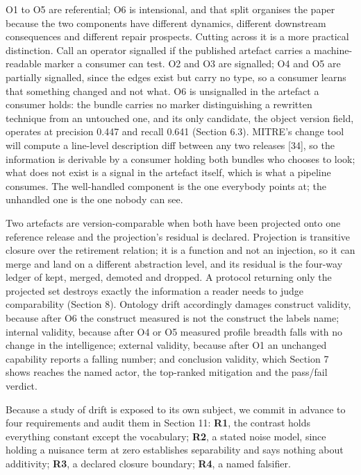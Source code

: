 \documentclass[11pt,a4paper]{article}
\begin{document}
O1 to O5 are referential; O6 is intensional, and that split organises the paper because the two components have different dynamics, different downstream consequences and different repair prospects. Cutting across it is a more practical distinction. Call an operator signalled if the published artefact carries a machine-readable marker a consumer can test. O2 and O3 are signalled; O4 and O5 are partially signalled, since the edges exist but carry no type, so a consumer learns that something changed and not what. O6 is unsignalled in the artefact a consumer holds: the bundle carries no marker distinguishing a rewritten technique from an untouched one, and its only candidate, the object version field, operates at precision 0.447 and recall 0.641 (Section 6.3). MITRE's change tool will compute a line-level description diff between any two releases [34], so the information is derivable by a consumer holding both bundles who chooses to look; what does not exist is a signal in the artefact itself, which is what a pipeline consumes. The well-handled component is the one everybody points at; the unhandled one is the one nobody can see.

Two artefacts are version-comparable when both have been projected onto one reference release and the projection's residual is declared. Projection is transitive closure over the retirement relation; it is a function and not an injection, so it can merge and land on a different abstraction level, and its residual is the four-way ledger of kept, merged, demoted and dropped. A protocol returning only the projected set destroys exactly the information a reader needs to judge comparability (Section 8). Ontology drift accordingly damages construct validity, because after O6 the construct measured is not the construct the labels name; internal validity, because after O4 or O5 measured profile breadth falls with no change in the intelligence; external validity, because after O1 an unchanged capability reports a falling number; and conclusion validity, which Section 7 shows reaches the named actor, the top-ranked mitigation and the pass/fail verdict.

Because a study of drift is exposed to its own subject, we commit in advance to four requirements and audit them in Section 11: \textbf{R1}, the contrast holds everything constant except the vocabulary; \textbf{R2}, a stated noise model, since holding a nuisance term at zero establishes separability and says nothing about additivity; \textbf{R3}, a declared closure boundary; \textbf{R4}, a named falsifier.
\end{document}
